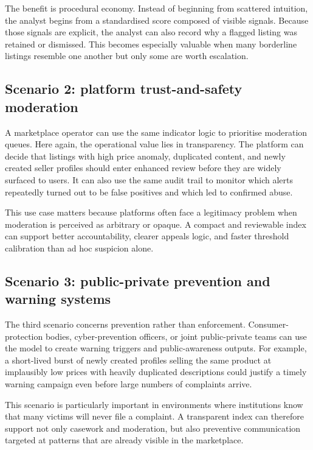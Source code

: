 \documentclass[11pt,a4paper]{article}
\begin{document}
The benefit is procedural economy. Instead of beginning from scattered intuition, the analyst begins from a standardised score composed of visible signals. Because those signals are explicit, the analyst can also record why a flagged listing was retained or dismissed. This becomes especially valuable when many borderline listings resemble one another but only some are worth escalation.

\subsection{Scenario 2: platform trust-and-safety moderation}
A marketplace operator can use the same indicator logic to prioritise moderation queues. Here again, the operational value lies in transparency. The platform can decide that listings with high price anomaly, duplicated content, and newly created seller profiles should enter enhanced review before they are widely surfaced to users. It can also use the same audit trail to monitor which alerts repeatedly turned out to be false positives and which led to confirmed abuse.

This use case matters because platforms often face a legitimacy problem when moderation is perceived as arbitrary or opaque. A compact and reviewable index can support better accountability, clearer appeals logic, and faster threshold calibration than ad hoc suspicion alone.

\subsection{Scenario 3: public-private prevention and warning systems}
The third scenario concerns prevention rather than enforcement. Consumer-protection bodies, cyber-prevention officers, or joint public-private teams can use the model to create warning triggers and public-awareness outputs. For example, a short-lived burst of newly created profiles selling the same product at implausibly low prices with heavily duplicated descriptions could justify a timely warning campaign even before large numbers of complaints arrive.

This scenario is particularly important in environments where institutions know that many victims will never file a complaint. A transparent index can therefore support not only casework and moderation, but also preventive communication targeted at patterns that are already visible in the marketplace.
\end{document}

